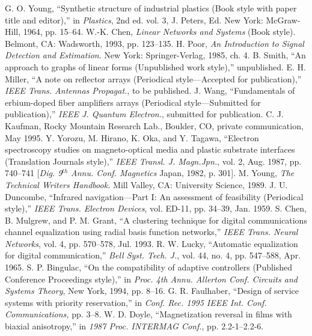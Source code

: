 \documentclass[transmag, onecolumn]{IEEEtran}
\begin{document}
\begin{thebibliography}{00}
 G. O. Young, ``Synthetic structure of industrial plastics (Book style with paper title and editor),'' in \emph{Plastics}, 2nd ed. vol. 3, J. Peters, Ed. New York: McGraw-Hill, 1964, pp. 15--64.
 W.-K. Chen, \emph{Linear Networks and Systems} (Book style)$. $Belmont, CA: Wadsworth, 1993, pp. 123--135.
 H. Poor, \emph{An Introduction to Signal Detection and Estimation}. New York: Springer-Verlag, 1985, ch. 4.
 B. Smith, ``An approach to graphs of linear forms (Unpublished work style),'' unpublished.
 E. H. Miller, ``A note on reflector arrays (Periodical style---Accepted for publication),'' \emph{IEEE Trans. Antennas Propagat.}, to be published.
 J. Wang, ``Fundamentals of erbium-doped fiber amplifiers arrays (Periodical style---Submitted for publication),'' \emph{IEEE J. Quantum Electron.}, submitted for publication.
 C. J. Kaufman, Rocky Mountain Research Lab., Boulder, CO, private communication, May 1995.
 Y. Yorozu, M. Hirano, K. Oka, and Y. Tagawa, ``Electron spectroscopy studies on magneto-optical media and plastic substrate interfaces (Translation Journals style),'' \emph{IEEE Transl. J. Magn.Jpn.}, vol. 2, Aug. 1987, pp. 740--741 [\emph{Dig. 9}$^{th}$\emph{ Annu. Conf. Magnetics} Japan, 1982, p. 301].
 M. Young, \emph{The Technical Writers Handbook.} Mill Valley, CA: University Science, 1989.
 J. U. Duncombe, ``Infrared navigation---Part I: An assessment of feasibility (Periodical style),'' \emph{IEEE Trans. Electron Devices}, vol. ED-11, pp. 34--39, Jan. 1959.
 S. Chen, B. Mulgrew, and P. M. Grant, ``A clustering technique for digital communications channel equalization using radial basis function networks,'' \emph{IEEE Trans. Neural Networks}, vol. 4, pp. 570--578, Jul. 1993.
 R. W. Lucky, ``Automatic equalization for digital communication,'' \emph{Bell Syst. Tech. J.}, vol. 44, no. 4, pp. 547--588, Apr. 1965.
 S. P. Bingulac, ``On the compatibility of adaptive controllers (Published Conference Proceedings style),'' in \emph{Proc. 4th Annu. Allerton Conf. Circuits and Systems Theory}, New York, 1994, pp. 8--16.
 G. R. Faulhaber, ``Design of service systems with priority reservation,'' in \emph{Conf. Rec. 1995 IEEE Int. Conf. Communications,} pp. 3--8.
 W. D. Doyle, ``Magnetization reversal in films with biaxial anisotropy,'' in \emph{1987 Proc. INTERMAG Conf.}, pp. 2.2-1--2.2-6.

\end{thebibliography}
\end{document}
